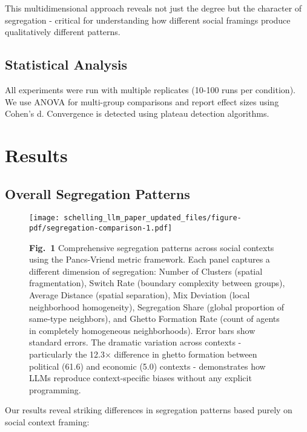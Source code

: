 \documentclass[pdflatex,sn-basic]{sn-jnl}%
\begin{document}
This multidimensional approach reveals not just the degree but the
character of segregation - critical for understanding how different
social framings produce qualitatively different patterns.

\subsection{Statistical Analysis}\label{statistical-analysis}

All experiments were run with multiple replicates (10-100 runs per
condition). We use ANOVA for multi-group comparisons and report effect
sizes using Cohen's d. Convergence is detected using plateau detection
algorithms.

\section{Results}\label{results}

\subsection{Overall Segregation
Patterns}\label{overall-segregation-patterns}


\begin{figure}[ht]
\centering
\texttt{[image: schelling\_llm\_paper\_updated\_files/figure-pdf/segregation-comparison-1.pdf]}
\caption{\textbf{Fig.~1} Comprehensive segregation patterns across social
contexts using the Pancs-Vriend metric framework. Each panel captures a
different dimension of segregation: Number of Clusters (spatial
fragmentation), Switch Rate (boundary complexity between groups),
Average Distance (spatial separation), Mix Deviation (local neighborhood
homogeneity), Segregation Share (global proportion of same-type
neighbors), and Ghetto Formation Rate (count of agents in completely
homogeneous neighborhoods). Error bars show standard errors. The
dramatic variation across contexts - particularly the 12.3× difference
in ghetto formation between political (61.6) and economic (5.0) contexts
- demonstrates how LLMs reproduce context-specific biases without any
explicit programming.}
\label{fig:segregation-comparison}
\end{figure}

Our results reveal striking differences in segregation patterns based
purely on social context framing:
\end{document}
